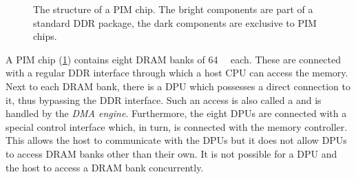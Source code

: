 \begin{figure}

	\caption{
		The structure of a \ac{PIM} chip.
		The bright components are part of a standard \ac{DDR} package, the dark components are exclusive to \ac{PIM} chips.~\cite{upmem2021WhitePaper}
	}
	\label{fig:arch:chip}
\end{figure}

A \ac{PIM} chip (\cref{fig:arch:chip}) contains eight \ac{DRAM} banks of \qty{64}{\mebi\byte} each.
These are connected with a regular \ac{DDR} interface through which a host \ac{CPU} can access the memory.
Next to each \ac{DRAM} bank, there is a \ac{DPU} which possesses a direct connection to it, thus bypassing the \ac{DDR} interface.
Such an access is also called a  and is handled by the \emph{\ac{DMA} engine}.
Furthermore, the eight \acp{DPU} are connected with a special control interface which, in turn, is connected with the memory controller.
This allows the host to communicate with the \acp{DPU} but it does not allow \acp{DPU} to access \ac{DRAM} banks other than their own.
It is not possible for a \ac{DPU} and the host to access a \ac{DRAM} bank concurrently.

